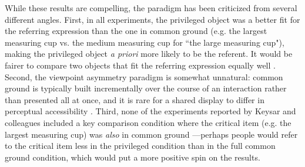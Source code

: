 \documentclass[10pt,letterpaper]{article}
\begin{document}
While these results are compelling, the paradigm has been criticized from several different angles. First, in all experiments, the privileged object was a better fit for the referring expression than the one in common ground (e.g. the largest measuring cup vs. the medium measuring cup for ``the large measuring cup"), making the privileged object \emph{a priori} more likely to be the referent. It would be fairer to compare two objects that fit the referring expression equally well \cite{HellerGrodnerTanenhaus08_Perspective}. Second, the viewpoint asymmetry paradigm is somewhat unnatural: common ground is typically built incrementally over the course of an interaction rather than presented all at once, and it is rare for a shared display to differ in perceptual accessibility \cite{HannaTanenhausTrueswell03_CommonGroundPerspective}. Third, none of the experiments reported by Keysar and colleagues included a key comparison condition where the critical item (e.g. the largest measuring cup) was \emph{also} in common ground \cite{BrownSchmidtHanna11_IncrementalPerspectiveTaking}---perhaps people would refer to the critical item less in the privileged condition than in the full common ground condition, which would put a more positive spin on the results. %
\end{document}
